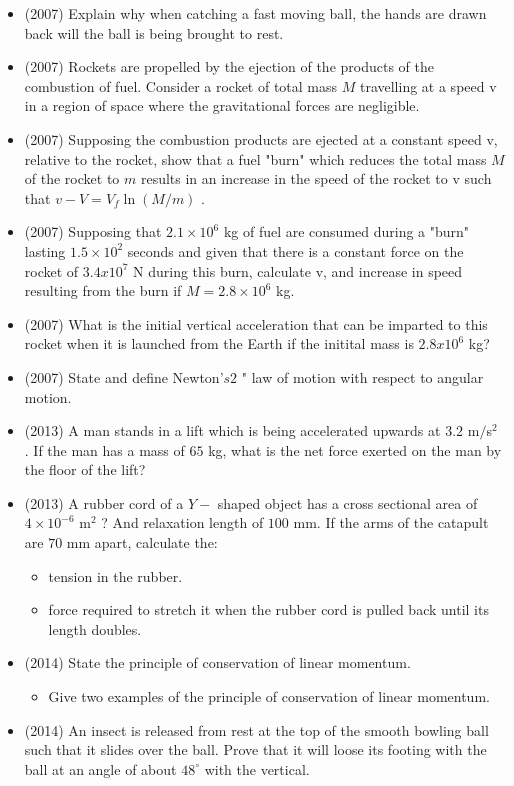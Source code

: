 \documentclass{article}
\begin{document}
\begin{itemize}
\item (2007)  Explain why when catching a fast moving ball, the hands are drawn back will the ball is being brought to rest.
\item (2007)  Rockets are propelled by the ejection of the products of the combustion of fuel.  Consider a rocket of total mass $ M$ travelling at a speed v in a region of space where the gravitational forces are negligible.  
\item (2007)  Supposing the combustion products are ejected at a constant speed v, relative to the rocket, show that a fuel "burn" which reduces the total mass $ M$ of the rocket to $ m$ results in an increase in the speed of the rocket to v such that $ v-V=V_{f} \ln (M/m)$ .
\item (2007)  Supposing that $ 2.1\times10^{6}$ kg of fuel are consumed during a "burn" lasting $ 1.5\times10^{2}$ seconds and given that there is a constant force on the rocket of $ 3.4x10^{7}$ N during this burn, calculate v, and increase in speed resulting from the burn if $ M=2.8\times10^{6}$ kg.  
\item (2007)  What is the initial vertical acceleration that can be imparted to this rocket when it is launched from the Earth if the initital mass is $ 2.8x10^{6}$ kg?
\item (2007)  State and define Newton’$ s2$ " law of motion with respect to angular motion. 
\item (2013)  A man stands in a lift which is being accelerated upwards at $ 3.2$ m$/$s$ ^{2}$ . If the man has a mass of $ 65$ kg, what is the net force exerted on the man by the floor of the lift?
\item (2013)  A rubber cord of a $ Y-$ shaped object has a cross sectional area of $ 4 \times 10^{-6}$ m$ ^{2}$ ? And relaxation length of $ 100$ mm. If the arms of the catapult are $ 70$ mm apart, calculate the: \begin{itemize}
\item tension in the rubber. 
\item force required to stretch it when the rubber cord is pulled back until its length doubles. 
\end{itemize}
\item (2014)  State the principle of conservation of linear momentum. \begin{itemize}
\item Give two examples of the principle of conservation of linear momentum. 
\end{itemize}
\item (2014)  An insect is released from rest at the top of the smooth bowling ball such that it slides over the ball. Prove that it will loose its footing with the ball at an angle of about $ 48^{\circ}$ with the vertical.

\end{itemize}
\end{document}
